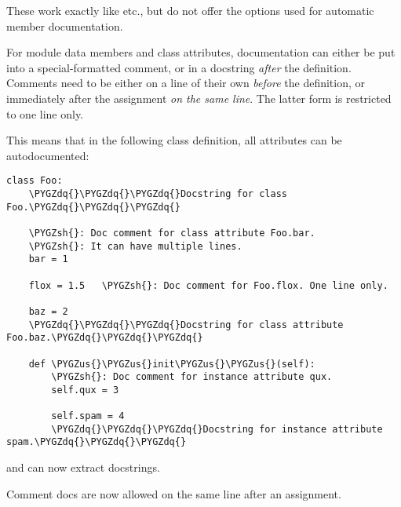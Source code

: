 \documentclass[letterpaper,10pt,english]{sphinxmanual}
\def\PYGZus{\char`\_}
\def\PYGZsh{\char`\#}
\def\PYGZdq{\char`\"}
\begin{document}
\begin{fulllineitems}
\label{ext/autodoc:directive-autofunction}\label{ext/autodoc:directive-autodata}\label{ext/autodoc:directive-automethod}\label{ext/autodoc:directive-autoattribute}
These work exactly like {\hyperref[ext/autodoc:directive\string-autoclass]{}} etc., but do not offer the options
used for automatic member documentation.

For module data members and class attributes, documentation can either be put
into a special-formatted comment, or in a docstring \emph{after} the definition.
Comments need to be either on a line of their own \emph{before} the definition, or
immediately after the assignment \emph{on the same line}.  The latter form is
restricted to one line only.

This means that in the following class definition, all attributes can be
autodocumented:

\begin{Verbatim}[commandchars=\\\{\}]
class Foo:
    \PYGZdq{}\PYGZdq{}\PYGZdq{}Docstring for class Foo.\PYGZdq{}\PYGZdq{}\PYGZdq{}

    \PYGZsh{}: Doc comment for class attribute Foo.bar.
    \PYGZsh{}: It can have multiple lines.
    bar = 1

    flox = 1.5   \PYGZsh{}: Doc comment for Foo.flox. One line only.

    baz = 2
    \PYGZdq{}\PYGZdq{}\PYGZdq{}Docstring for class attribute Foo.baz.\PYGZdq{}\PYGZdq{}\PYGZdq{}

    def \PYGZus{}\PYGZus{}init\PYGZus{}\PYGZus{}(self):
        \PYGZsh{}: Doc comment for instance attribute qux.
        self.qux = 3

        self.spam = 4
        \PYGZdq{}\PYGZdq{}\PYGZdq{}Docstring for instance attribute spam.\PYGZdq{}\PYGZdq{}\PYGZdq{}
\end{Verbatim}

 and {\hyperref[ext/autodoc:directive\string-autoattribute]{}} can now extract docstrings.

Comment docs are now allowed on the same line after an assignment.


\end{fulllineitems}
\end{document}
